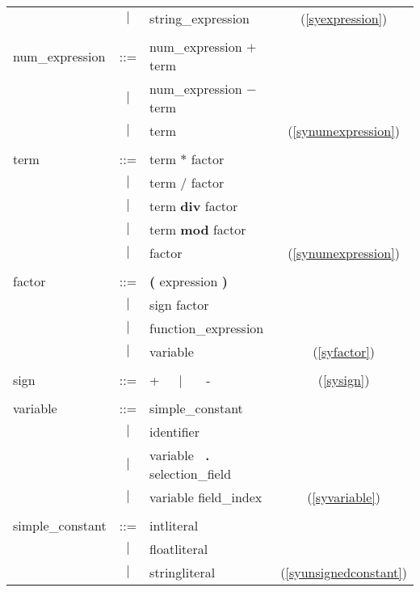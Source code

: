 \begin{tabular}{lclc}
          & $|$ & string\_expression   & (\ref{syexpression}) \\
& & & \\
  num\_expression & ::= & num\_expression $+$ term \\
          & $|$ &  num\_expression $-$ term \\
          & $|$ &  term   & (\ref{synumexpression}) \\
& & & \\
  term & ::= & term $*$ factor \\
          & $|$ &  term $/$ factor \\
          & $|$ &  term {\bf div}\index{div} factor \\
          & $|$ &  term {\bf mod}\index{mod} factor \\
          & $|$ &  factor   & (\ref{synumexpression}) \\
& & & \\
  factor & ::= & {{\bf (} expression {\bf )}} \\
          & $|$ & {sign factor} \\
          & $|$ & function\_expression  \\
          & $|$ & {variable}   & (\ref{syfactor}) \\
& & & \\
  sign & ::= & +~~~$|$~~~ -   & (\ref{sysign}) \\
& & & \\
  variable & ::= & simple\_constant \\
          & $|$ & identifier \\
          & $|$ & variable {\bf ~.~} selection\_field \\
          & $|$ & variable field\_index   & (\ref{syvariable}) \\ 
& & & \\  
  simple\_constant & ::= & intliteral\index{Literal!ganzzahliges} \\
          & $|$ & floatliteral\index{Literal!rationales} \\
          & $|$ & stringliteral\index{Literal!Zeichenkette}   & (\ref{syunsignedconstant}) \\ 
\end{tabular}

